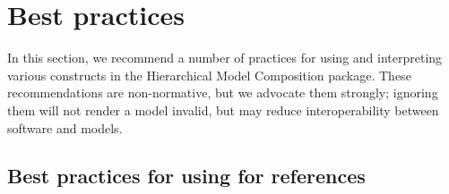 
\section{Best practices}
\label{best-practices}

In this section, we recommend a number of practices for using and
interpreting various constructs in the Hierarchical Model Composition
package.  These recommendations are non-normative, but we advocate them
strongly; ignoring them will not render a model invalid, but may reduce
interoperability between software and models.


\subsection{Best practices for using  for references}
\label{best-practices-sbaseref}






